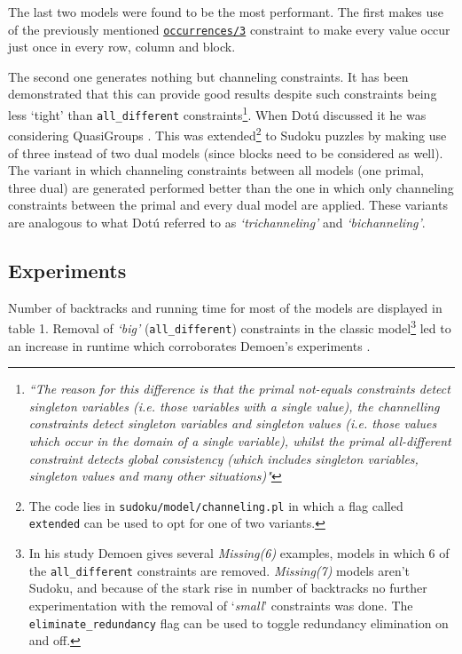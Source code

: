 The last two models were found to be the most performant. The first makes use of the previously mentioned \href{http://eclipseclp.org/doc/bips/lib/ic_global/occurrences-3.html}{\texttt{occurrences/3}} constraint to make every value occur just once in every row, column and block. 
\par The second one generates nothing but channeling constraints. It has been demonstrated that this can provide good results despite such constraints being less `tight' than \texttt{all\_different} constraints\footnote{\textit{``The reason for this difference is that the primal not-equals constraints detect singleton variables (i.e. those variables with a single value), the channelling constraints detect singleton variables and singleton values (i.e. those values which occur in the domain of a single variable), whilst the primal all-different constraint detects global consistency (which includes singleton variables, singleton values and many other situations)"}\cite{article:channeling}}. When Dot\'u discussed it he was considering QuasiGroups \cite{article:quasi}. This was extended\footnote{The code lies in \texttt{sudoku/model/channeling.pl} in which a flag called \texttt{extended} can be used to opt for one of two variants.} to Sudoku puzzles by making use of three instead of two dual models (since blocks need to be considered as well). The variant in which channeling constraints between all models (one primal, three dual) are generated performed better than the one in which only channeling constraints between the primal and every dual model are applied. These variants are analogous to what Dot\'u referred to as \textit{`trichanneling'} and \textit{`bichanneling'}.\\\par

\subsection{Experiments}

Number of backtracks and running time for most of the models are displayed in table 1. Removal of \textit{`big'} (\texttt{all\_different}) constraints in the classic model\footnote{In his study Demoen gives several \textit{Missing(6)} examples, models in which 6 of the \texttt{all\_different} constraints are removed. \textit{Missing(7)} models aren't Sudoku, and because of the stark rise in number of backtracks no further experimentation with the removal of `\textit{small}' constraints was done. The \texttt{eliminate\_redundancy} flag can be used to toggle redundancy elimination on and off.} led to an increase in runtime which corroborates Demoen's experiments \cite{article:demoen}. \\\par

